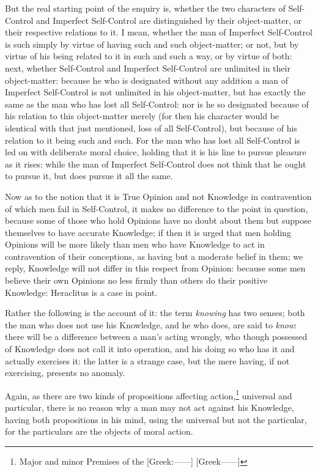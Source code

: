 But the real starting point of the enquiry is, whether the two characters of
Self-Control and Imperfect Self-Control are distinguished by their
object-matter, or their respective relations to it. I mean, whether the man of
Imperfect Self-Control is such simply by virtue of having such and such
object-matter; or not, but by virtue of his being related to it in such and
such a way, or by virtue of both: next, whether Self-Control and Imperfect
Self-Control are unlimited in their object-matter: because he who is designated
without any addition a man of Imperfect Self-Control is not unlimited in his
object-matter, but has exactly the same as the man who has lost all
Self-Control: nor is he so designated because of his relation to this
object-matter merely (for then his character would be identical with that just
mentioned, loss of all Self-Control), but because of his relation to it being
such and such. For the man who has lost all Self-Control is led on with
deliberate moral choice, holding that it is his line to pursue pleasure as it
rises: while the man of Imperfect Self-Control does not think that he ought to
pursue it, but does pursue it all the same.

Now as to the notion that it is True Opinion and not Knowledge in contravention
of which men fail in Self-Control, it makes no difference to the point in
question, because some of those who hold Opinions have no doubt about them but
suppose themselves to have accurate Knowledge; if then it is urged that men
holding Opinions will be more likely than men who have Knowledge to act in
contravention of their conceptions, as having but a moderate belief in them; we
reply, Knowledge will not differ in this respect from Opinion: because some men
believe their own Opinions no less firmly than others do their positive
Knowledge: Heraclitus is a case in point.

Rather the following is the account of it: the term \emph{knowing} has two
senses; both the man who does not use his Knowledge, and he who does, are said
to \emph{know}: there will be a difference between a man’s acting
wrongly, who though possessed of Knowledge does not call it into operation, and
his doing so who has it and actually exercises it: the latter is a strange
case, but the mere having, if not exercising, presents no anomaly.

Again, as there are two kinds of propositions affecting
action,\footnote{Major and minor Premises of the [Greek:——] [Greek——]}
universal and particular, there is no reason why a man may not act against his
Knowledge, having both propositions in his mind, using the universal but not
the particular, for the particulars are the objects of moral action.

